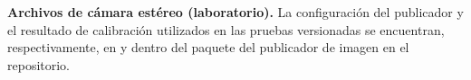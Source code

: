 \documentclass[12pt,a4paper]{report}
\begin{document}
\noindent\textbf{Archivos de cámara estéreo (laboratorio).} La configuración del
publicador y el resultado de calibración utilizados en las pruebas versionadas
se encuentran, respectivamente, en  y
 dentro del paquete
del publicador de imagen en el repositorio.

%     

%     
\end{document}
